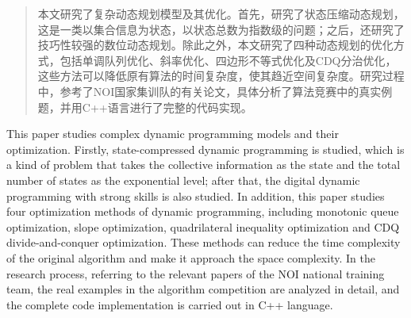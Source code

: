 

\begin{abstract}

	本文研究了复杂动态规划模型及其优化。首先，研究了状态压缩动态规划，这是一类以集合信息为状态，以状态总数为指数级的问题；之后，还研究了技巧性较强的数位动态规划。除此之外，本文研究了四种动态规划的优化方式，包括单调队列优化、斜率优化、四边形不等式优化及CDQ分治优化，这些方法可以降低原有算法的时间复杂度，使其趋近空间复杂度。研究过程中，参考了NOI国家集训队的有关论文，具体分析了算法竞赛中的真实例题，并用C++语言进行了完整的代码实现。

\end{abstract}

\begin{abstract*}

	This paper studies complex dynamic programming models and their optimization. Firstly, state-compressed dynamic programming is studied, which is a kind of problem that takes the collective information as the state and the total number of states as the exponential level; after that, the digital dynamic programming with strong skills is also studied. In addition, this paper studies four optimization methods of dynamic programming, including monotonic queue optimization, slope optimization, quadrilateral inequality optimization and CDQ divide-and-conquer optimization. These methods can reduce the time complexity of the original algorithm and make it approach the space complexity. In the research process, referring to the relevant papers of the NOI national training team, the real examples in the algorithm competition are analyzed in detail, and the complete code implementation is carried out in C++ language.

\end{abstract*}
